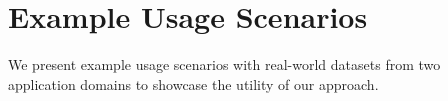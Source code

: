 \section{Example Usage Scenarios}
\label{section:case}

We present example usage scenarios with real-world datasets from two application domains to showcase the utility of our approach.








